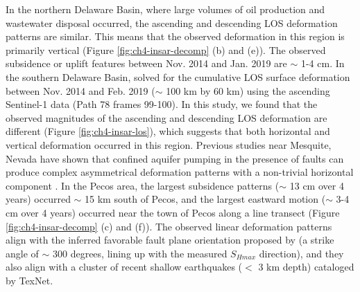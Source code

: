 


In the northern Delaware Basin, where large volumes of oil production and wastewater disposal occurred, the ascending and descending LOS deformation patterns are similar. This means that the observed deformation in this region is primarily vertical (Figure \ref{fig:ch4-insar-decomp} (b) and (e)). The observed subsidence or uplift features between Nov. 2014 and Jan. 2019 are $\sim$ 1-4 cm. In the southern Delaware Basin, \cite{Deng2020SurfaceDeformationInduced} solved for the cumulative LOS surface deformation between Nov. 2014 and Feb. 2019 ($\sim$ 100 km by 60 km) using the ascending Sentinel-1 data (Path 78 frames 99-100). In this study, we found that the observed magnitudes of the ascending and descending LOS deformation are different (Figure \ref{fig:ch4-insar-los}), which suggests that both horizontal and vertical deformation occurred in this region. Previous studies near Mesquite, Nevada have shown that confined aquifer pumping in the presence of faults can produce complex asymmetrical deformation patterns with a non-trivial horizontal component \citep{Burbey2008InfluenceGeologicStructures}. In the Pecos area, the largest subsidence patterns ($\sim$ 13 cm over 4 years) occurred $\sim$ 15 km south of Pecos, and the largest eastward motion ($\sim$ 3-4 cm over 4 years) occurred near the town of Pecos along a line transect (Figure \ref{fig:ch4-insar-decomp} (c) and (f)). The observed linear deformation patterns align with the inferred favorable fault plane orientation proposed by \cite{LundSnee2018StateStressPermian} (a strike angle of $\sim$ 300 degrees, lining up with the measured $S_{Hmax}$ direction), and they also align with a cluster of recent shallow earthquakes ($<$ 3 km depth) cataloged by TexNet.



